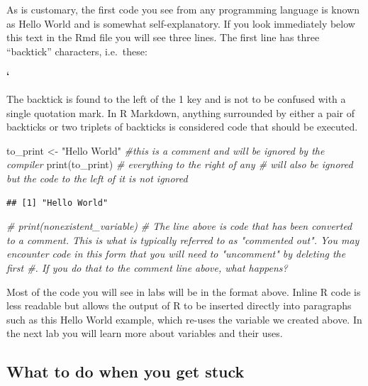 \documentclass[
]{article}
\newenvironment{Shaded}{\begin{snugshade}}{\end{snugshade}}
\newcommand{\CommentTok}[1]{\textcolor[rgb]{0.56,0.35,0.01}{\textit{#1}}}
\newcommand{\FunctionTok}[1]{\textcolor[rgb]{0.00,0.00,0.00}{#1}}
\newcommand{\NormalTok}[1]{#1}
\newcommand{\OtherTok}[1]{\textcolor[rgb]{0.56,0.35,0.01}{#1}}
\newcommand{\StringTok}[1]{\textcolor[rgb]{0.31,0.60,0.02}{#1}}
\begin{document}
As is customary, the first code you see from any programming language is
known as Hello World and is somewhat self-explanatory. If you look
immediately below this text in the Rmd file you will see three lines.
The first line has three ``backtick'' characters, i.e.~these:

\textbf{`}

The backtick is found to the left of the 1 key and is not to be confused
with a single quotation mark. In R Markdown, anything surrounded by
either a pair of backticks or two triplets of backticks is considered
code that should be executed.

\begin{Shaded}
\begin{Highlighting}[]
\NormalTok{to\_print }\OtherTok{\textless{}{-}} \StringTok{"Hello World"}
\CommentTok{\#this is a comment and will be ignored by the compiler}
\FunctionTok{print}\NormalTok{(to\_print)  }\CommentTok{\# everything to the right of any \# will also be ignored but the code to the left of it is not ignored}
\end{Highlighting}
\end{Shaded}

\begin{verbatim}
## [1] "Hello World"
\end{verbatim}

\begin{Shaded}
\begin{Highlighting}[]
\CommentTok{\# print(nonexistent\_variable)}
\CommentTok{\# The line above is code that has been converted to a comment. This is what is typically referred to as "commented out". You may encounter code in this form that you will need to "uncomment" by deleting the first \#. If you do that to the comment line above, what happens?}
\end{Highlighting}
\end{Shaded}

Most of the code you will see in labs will be in the format above.
Inline R code is less readable but allows the output of R to be inserted
directly into paragraphs such as this Hello World example, which re-uses
the variable we created above. In the next lab you will learn more about
variables and their uses.

\hypertarget{what-to-do-when-you-get-stuck}{%
\subsection{What to do when you get
stuck}\label{what-to-do-when-you-get-stuck}}
\end{document}
